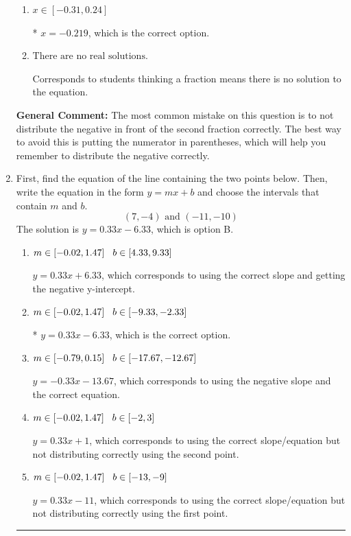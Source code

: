 \documentclass{extbook}[14pt]
\newcommand{\litem}[1]{\item #1

\rule{\textwidth}{0.4pt}}
\begin{document}
\begin{enumerate}
{\begin{enumerate}[label=\Alph*.]
$x = 1.156$, which corresponds to not distributing the negative in front of the first parentheses correctly.
\item \( x \in [-0.31, 0.24] \)

* $x = -0.219$, which is the correct option.
\item \( \text{There are no real solutions.} \)

Corresponds to students thinking a fraction means there is no solution to the equation.
\end{enumerate}

\textbf{General Comment:} The most common mistake on this question is to not distribute the negative in front of the second fraction correctly. The best way to avoid this is putting the numerator in parentheses, which will help you remember to distribute the negative correctly.
}
\litem{
First, find the equation of the line containing the two points below. Then, write the equation in the form $ y=mx+b $ and choose the intervals that contain $m$ and $b$.
\[ (7, -4) \text{ and } (-11, -10) \]The solution is \( y = 0.33x -6.33 \), which is option B.\begin{enumerate}[label=\Alph*.]
\item \( m \in [-0.02, 1.47] \hspace*{3mm} b \in [4.33, 9.33] \)

 $y = 0.33x + 6.33$, which corresponds to using the correct slope and getting the negative y-intercept.
\item \( m \in [-0.02, 1.47] \hspace*{3mm} b \in [-9.33, -2.33] \)

* $y = 0.33x -6.33$, which is the correct option.
\item \( m \in [-0.79, 0.15] \hspace*{3mm} b \in [-17.67, -12.67] \)

 $y = -0.33x -13.67$, which corresponds to using the negative slope and the correct equation.
\item \( m \in [-0.02, 1.47] \hspace*{3mm} b \in [-2, 3] \)

 $y = 0.33x + 1$, which corresponds to using the correct slope/equation but not distributing correctly using the second point.
\item \( m \in [-0.02, 1.47] \hspace*{3mm} b \in [-13, -9] \)

 $y = 0.33x -11$, which corresponds to using the correct slope/equation but not distributing correctly using the first point.
\end{enumerate}

}
\end{enumerate}
\end{document}
